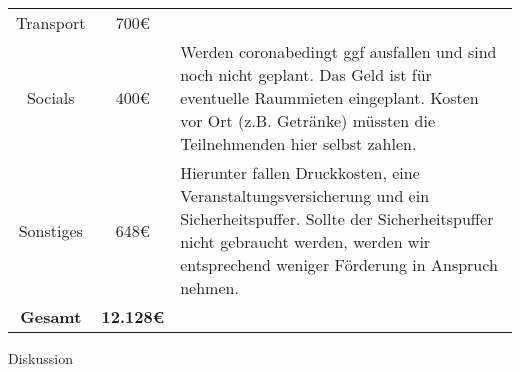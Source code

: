 {\begin{tabular}{c c p{10cm}}
        Transport & 700€ & \\
        Socials & 400€ & Werden coronabedingt ggf ausfallen und sind noch nicht geplant. Das Geld ist für eventuelle Raummieten eingeplant. Kosten vor Ort (z.B. Getränke) müssten die Teilnehmenden hier selbst zahlen. \\
        Sonstiges & 648€ & Hierunter fallen Druckkosten, eine Veranstaltungsversicherung und ein Sicherheitspuffer. Sollte der Sicherheitspuffer nicht gebraucht werden, werden wir entsprechend weniger Förderung in Anspruch nehmen. \\ 
        \textbf{Gesamt} & \textbf{12.128€} & \\       
    \end{tabular}

}{
    Diskussion
}
